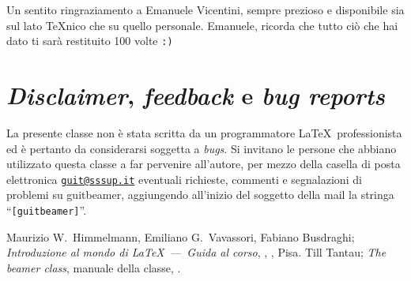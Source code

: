 \documentclass[a4paper,10pt]{article}
\newcommand{\pkg}[1]{\textsf{#1}}
\let\cls\pkg
\begin{document}
Un sentito ringraziamento a Emanuele Vicentini, sempre prezioso e
disponibile sia sul lato \TeX nico che su quello personale. Emanuele,
ricorda che tutto ciò che hai dato ti sarà restituito 100 volte
\texttt{:)}

\section{\textit{Disclaimer}, \textit{feedback} e \textit{bug
reports}}\label{sec:fb&b}
La presente classe non è stata scritta da un programmatore \LaTeX\
professionista ed è pertanto da considerarsi soggetta a
\textit{bugs}. Si invitano le persone che abbiano utilizzato questa
classe a far pervenire all'autore, per mezzo della casella di posta
elettronica \href{mailto:guit@sssup.it?subject=[guitbeamer]
Feedback}{\texttt{guit@sssup.it}} eventuali richieste, commenti e
segnalazioni di problemi su \cls{guitbeamer}, aggiungendo all'inizio
del soggetto della mail la stringa ``\verb+[guitbeamer]+''.

\vfill

\begin{thebibliography}{99}
   Maurizio W.~Himmelmann, Emiliano G.~Vavassori,
    Fabiano Busdraghi; \newblock\emph{Introduzione al mondo di \LaTeX\ ---\
    Guida al corso}, , \GuITtext, Pisa.
  \bibitem{manbeamer} Till Tantau; \newblock\emph{The \cls{beamer}
    class}, manuale della classe, \newblock 2005.
\end{thebibliography}
\end{document}
